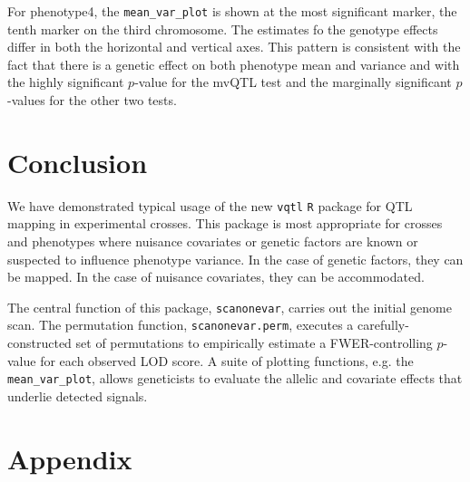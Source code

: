 \documentclass[9pt,twocolumn,twoside]{gsag3jnl}
\begin{document}
For phenotype4, the \texttt{mean\_var\_plot} is shown at the most significant marker, the tenth marker on the third chromosome.
The estimates fo the genotype effects differ in both the horizontal and vertical axes.
This pattern is consistent with the fact that there is a genetic effect on both phenotype mean and variance and with the highly significant $p$-value for the mvQTL test and the marginally significant $p$-values for the other two tests.






\section*{Conclusion}

We have demonstrated typical usage of the new \texttt{vqtl} \texttt{R} package for QTL mapping in experimental crosses.
This package is most appropriate for crosses and phenotypes where nuisance covariates or genetic factors are known or suspected to influence phenotype variance.
In the case of genetic factors, they can be mapped.
In the case of nuisance covariates, they can be accommodated.

The central function of this package, \texttt{scanonevar}, carries out the initial genome scan.
The permutation function, \texttt{scanonevar.perm}, executes a carefully-constructed set of permutations to empirically estimate a FWER-controlling $p$-value for each observed LOD score.
A suite of plotting functions, e.g. the \texttt{mean\_var\_plot}, allows geneticists to evaluate the allelic and covariate effects that underlie detected signals.






\newpage
\section*{Appendix}
\end{document}
